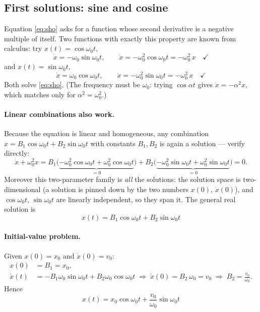 \documentclass[11pt]{article}
\theoremstyle{plain}
\theoremstyle{definition}
\theoremstyle{remark}
\begin{document}
\subsection{First solutions: sine and cosine}
\label{sec:sho-trig}

Equation \eqref{eq:sho} asks for a function whose second derivative is a
negative multiple of itself. Two functions with exactly this property are
known from calculus: try $x(t) = \cos\omega_0 t$,
\begin{equation}
  \dot x = -\omega_0 \sin\omega_0 t,
  \qquad
  \ddot x = -\omega_0^2\cos\omega_0 t = -\omega_0^2\, x
  \quad\checkmark
\end{equation}
and $x(t) = \sin\omega_0 t$,
\begin{equation}
  \dot x = \omega_0\cos\omega_0 t,
  \qquad
  \ddot x = -\omega_0^2 \sin\omega_0 t = -\omega_0^2\, x
  \quad\checkmark
\end{equation}
Both solve \eqref{eq:sho}. (The frequency must be $\omega_0$: trying
$\cos\alpha t$ gives $\ddot x = -\alpha^2 x$, which matches only for
$\alpha^2 = \omega_0^2$.)

\paragraph{Linear combinations also work.}
Because the equation is linear and homogeneous, any combination
$x = B_1\cos\omega_0 t + B_2\sin\omega_0 t$ with constants $B_1, B_2$ is
again a solution --- verify directly:
\begin{equation}
  \ddot x + \omega_0^2 x
  = B_1\bigl(\underbrace{-\omega_0^2\cos\omega_0 t + \omega_0^2\cos\omega_0 t}_{=0}\bigr)
  + B_2\bigl(\underbrace{-\omega_0^2\sin\omega_0 t + \omega_0^2\sin\omega_0 t}_{=0}\bigr)
  = 0 .
\end{equation}
Moreover this two-parameter family is \emph{all} the solutions: the solution
space is two-dimensional (a solution is pinned down by the two numbers
$x(0)$, $\dot x(0)$), and $\cos\omega_0 t$, $\sin\omega_0 t$ are linearly
independent, so they span it. The general real solution is
\begin{equation}
  \boxed{\;
  x(t) = B_1 \cos\omega_0 t + B_2 \sin\omega_0 t
  \;}
  \label{eq:sho-trig-general}
\end{equation}

\paragraph{Initial-value problem.}
Given $x(0)=x_0$ and $\dot x(0)=v_0$:
\begin{align}
  x(0) &= B_1 = x_0, \\
  \dot x(t) &= -B_1\omega_0 \sin\omega_0 t + B_2 \omega_0 \cos\omega_0 t
  \;\Longrightarrow\; \dot x(0) = B_2\,\omega_0 = v_0
  \;\Longrightarrow\; B_2 = \frac{v_0}{\omega_0}.
\end{align}
Hence
\begin{equation}
  \boxed{\;
  x(t) = x_0 \cos\omega_0 t + \frac{v_0}{\omega_0}\sin\omega_0 t
  \;}
  \label{eq:sho-ivp}
\end{equation}
\end{document}

